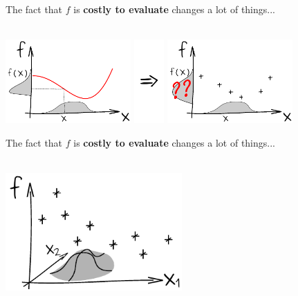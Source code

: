 \documentclass{beamer}
\begin{document}
\begin{frame}{}
The fact that $f$ is \textbf{costly to evaluate} changes a lot of things...\\
\vspace{5mm}
\\
\vspace{5mm}
\begin{center}
\includegraphics[height=3.2cm]{figures/ink_unprogf} \includegraphics[height=3.2cm]{figures/Rightarrow} \includegraphics[height=3.2cm]{figures/ink_unprogfX}
\end{center}
\end{frame}

\begin{frame}{}
The fact that $f$ is \textbf{costly to evaluate} changes a lot of things...\\
\vspace{5mm}
\\
\vspace{5mm}
\begin{center}
\includegraphics[height=4.5cm]{figures/ink_as2}
\end{center}
\end{frame}
\end{document}
